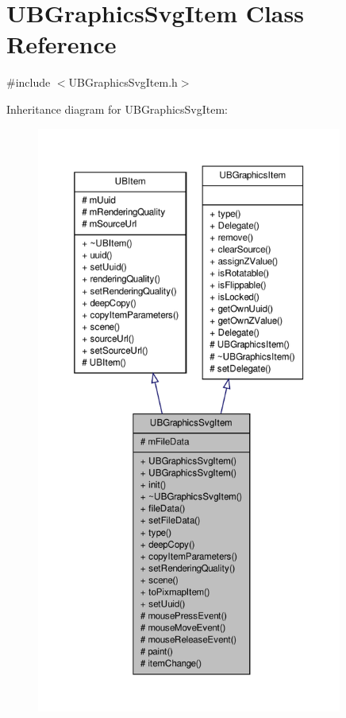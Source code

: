 \hypertarget{class_u_b_graphics_svg_item}{\section{U\-B\-Graphics\-Svg\-Item Class Reference}
\label{d1/dce/class_u_b_graphics_svg_item}
}


{\ttfamily \#include $<$U\-B\-Graphics\-Svg\-Item.\-h$>$}



Inheritance diagram for U\-B\-Graphics\-Svg\-Item\-:
\nopagebreak
\begin{figure}[H]
\begin{center}
\leavevmode
\includegraphics[height=550pt]{d6/d6a/class_u_b_graphics_svg_item__inherit__graph}
\end{center}
\end{figure}


